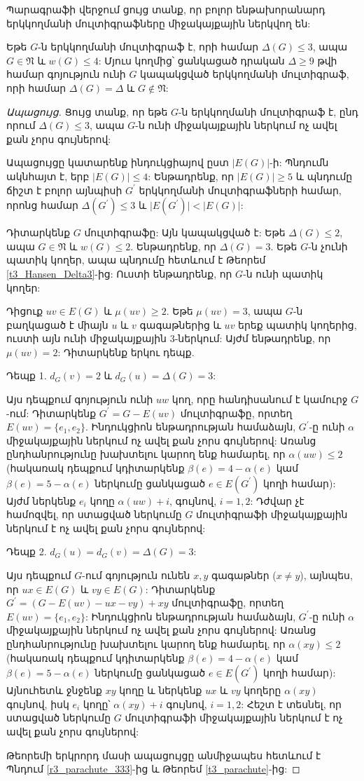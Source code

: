 Պարագրաֆի վերջում ցույց տանք, որ բոլոր ենթախորանարդ երկկողմանի մուլտիգրաֆները միջակայքային ներկվող են:

\begin{theorem}
\label{t3_bipartite_multi_Delta3} Եթե $G$-ն երկկողմանի մուլտիգրաֆ է, որի համար
$\Delta(G)\leq 3$, ապա $G\in \mathfrak{N}$ և $w(G)\leq 4$: Մյուս կողմից՝ ցանկացած դրական $\Delta \geq 9$ թվի համար գոյություն ունի $G$ կապակցված երկկողմանի մուլտիգրաֆ, որի համար $\Delta(G)=\Delta$ և $G\notin \mathfrak{N}$:
\end{theorem}
\begin{proof}[Ապացույց] Ցույց տանք, որ եթե $G$-ն երկկողմանի մուլտիգրաֆ է, ընդ որում $\Delta(G)\leq 3$, ապա
$G$-ն ունի միջակայքային ներկում ոչ ավել քան չորս գույներով:

Ապացույցը կատարենք ինդուկցիայով ըստ $\vert E(G)\vert$-ի: Պնդումն ակնհայտ է, երբ $\vert E(G)\vert\leq 4$:
Ենթադրենք, որ $\vert E(G)\vert\geq 5$ և պնդումը ճիշտ է բոլոր այնպիսի $G^{\prime}$ երկկողմանի մուլտիգրաֆների համար, 
որոնց համար $\Delta(G^{\prime})\leq 3$ և $\vert
E(G^{\prime})\vert<\vert E(G)\vert$:

Դիտարկենք $G$ մուլտիգրաֆը: Այն կապակցված է: Եթե
$\Delta(G)\leq 2$, ապա $G\in \mathfrak{N}$ և $w(G)\leq 2$. Ենթադրենք, որ $\Delta(G)=3$. Եթե $G$-ն չունի պատիկ կողեր, ապա պնդումը հետևում է Թեորեմ \ref{t3_Hansen_Delta3}-ից: Ուստի ենթադրենք, որ $G$-ն ունի պատիկ կողեր:

Դիցուք $uv\in E(G)$ և $\mu(uv)\geq 2$. Եթե $\mu(uv)= 3$, ապա $G$-ն բաղկացած է միայն $u$ և $v$ գագաթներից և $uv$ երեք պատիկ կողերից, ուստի այն ունի միջակայքային $3$-ներկում: Այժմ ենթադրենք, որ $\mu(uv)= 2$: Դիտարկենք երկու դեպք.

Դեպք 1. $d_{G}(v)=2$ և $d_{G}(u)=\Delta(G)=3$:

Այս դեպքում գոյություն ունի $uw$ կող, որը հանդիսանում է կամուրջ
$G$-ում: Դիտարկենք $G^{\prime}=G-E(uv)$ մուլտիգրաֆը, որտեղ
$E(uv)=\{e_{1},e_{2}\}$. Ինդուկցիոն ենթադրության համաձայն, $G^{\prime}$-ը ունի $\alpha$ միջակայքային ներկում ոչ ավել քան չորս գույներով:
Առանց ընդհանրությունը խախտելու կարող ենք համարել, որ $\alpha (uw)\leq 2$ (հակառակ դեպքում կդիտարկենք $\beta(e)=4-\alpha(e)$ կամ
$\beta(e)=5-\alpha(e)$ ներկումը ցանկացած $e\in E(G^{\prime})$ կողի համար): Այժմ ներկենք $e_{i}$ կողը $\alpha (uw)+i$, գույնով, $i=1,2$: Դժվար չէ համոզվել, որ ստացված ներկումը $G$ մուլտիգրաֆի միջակայքային ներկում է ոչ ավել քան չորս գույներով:

Դեպք 2. $d_{G}(u)=d_{G}(v)=\Delta(G)=3$:

Այս դեպքում $G$-ում գոյություն ունեն $x,y$ գագաթներ ($x\neq y$), այնպես, որ $ux\in E(G)$ և $vy\in E(G)$: Դիտարկենք $G^{\prime}=(G-E(uv)-ux-vy)+xy$ մուլտիգրաֆը, որտեղ $E(uv)=\{e_{1},e_{2}\}$: Ինդուկցիոն ենթադրության համաձայն, $G^{\prime}$-ը ունի $\alpha$ միջակայքային ներկում ոչ ավել քան չորս գույներով:
Առանց ընդհանրությունը խախտելու կարող ենք համարել, որ $\alpha (xy)\leq 2$ (հակառակ դեպքում կդիտարկենք $\beta(e)=4-\alpha(e)$ կամ
$\beta(e)=5-\alpha(e)$ ներկումը ցանկացած $e\in E(G^{\prime})$ կողի համար): Այնուհետև ջնջենք $xy$ կողը և ներկենք $ux$ և $vy$ կողերը
$\alpha (xy)$ գույնով, իսկ $e_{i}$ կողը՝ $\alpha (xy)+i$ գույնով,
$i=1,2$: Հեշտ է տեսնել, որ ստացված ներկումը $G$ մուլտիգրաֆի միջակայքային ներկում է ոչ ավել քան չորս գույներով:

Թեորեմի երկրորդ մասի ապացույցը անմիջապես հետևում է Պնդում \ref{r3_parachute_333}-ից և Թեորեմ \ref{t3_parachute}-ից:
\end{proof}